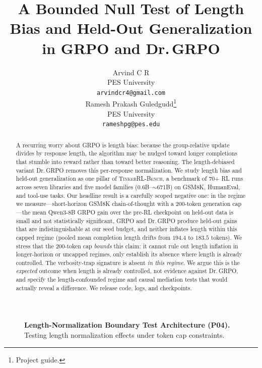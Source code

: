 \documentclass{article}
\title{A Bounded Null Test of Length Bias and Held-Out Generalization\\
       in GRPO and Dr.\,GRPO}
\author{
  Arvind C R \\
  PES University\\
  \texttt{arvindcr4@gmail.com} \\
  \And
  Ramesh Prakash Guledgudd\thanks{Project guide.} \\
  PES University\\
  \texttt{rameshpg@pes.edu} \\
}
\newcommand{\ours}{\textsc{TinkerRL-Bench}}
\begin{document}
\sloppy {}  \hfuzz=2pt
\maketitle
\begin{abstract}
A recurring worry about GRPO is length bias: because the group-relative update
divides by response length, the algorithm may be nudged toward longer completions
that stumble into reward rather than toward better reasoning. The length-debiased
variant Dr.\,GRPO removes this per-response normalization. We study length bias and
held-out generalization as one pillar of \ours{}, a benchmark of 70+ RL runs across
seven libraries and five model families ($0.6$B--$\sim$671B) on GSM8K, HumanEval,
and tool-use tasks. Our headline result is a carefully scoped negative one: in the
regime we measure---short-horizon GSM8K chain-of-thought with a 200-token
generation cap---the mean Qwen3-8B GRPO
gain over the pre-RL checkpoint on held-out data is small and not statistically
significant, GRPO and Dr.\,GRPO produce held-out gains that are indistinguishable
at our seed budget, and neither inflates length within this capped regime (pooled
mean completion length drifts from $194.4$ to $183.5$ tokens). We stress that the
$200$-token cap \emph{bounds} this claim: it cannot rule out length inflation in
longer-horizon or uncapped regimes, only establish its absence where length is
already controlled. The verbosity-trap signature is absent \emph{in this regime}. We argue this is the
\emph{expected} outcome when length is already controlled, not evidence against
Dr.\,GRPO, and specify the length-confounded regime and causal mediation tests that
would actually reveal a difference. We release code, logs, and checkpoints.
\end{abstract}
 
\begin{figure}[htbp]
\centering
{}
\caption{\textbf{Length-Normalization Boundary Test Architecture (P04).} Testing length normalization effects under token cap constraints.}
\label{fig:p4_length_bias_boundary}
\end{figure}
\end{document}

